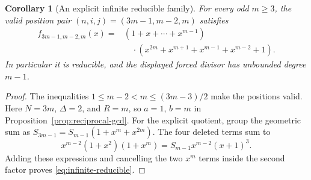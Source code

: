 \documentclass[11pt]{article}
\newtheorem{corollary}[proposition]{Corollary}
\theoremstyle{definition}
\theoremstyle{remark}
\begin{document}
\begin{corollary}[An explicit infinite reducible family]
\label{cor:infinite-reducible}
For every odd \(m\ge3\), the valid position pair
\((n,i,j)=(3m-1,m-2,m)\) satisfies
\begin{equation}\label{eq:infinite-reducible}
\begin{split}
 f_{3m-1,m-2,m}(x)
 ={}&(1+x+\cdots+x^{m-1})\\
 &\quad\cdot(x^{2m}+x^{m+1}+x^{m-1}+x^{m-2}+1).
\end{split}
\end{equation}
In particular it is reducible, and the displayed forced divisor
has unbounded degree \(m-1\).
\end{corollary}
\begin{proof}
The inequalities \(1\le m-2<m\le(3m-3)/2\) make the positions valid.
Here \(N=3m\), \(\Delta=2\), and \(R=m\), so
\(a=1\), \(b=m\) in Proposition~\ref{prop:reciprocal-gcd}.
For the explicit quotient, group the geometric sum as
\(S_{3m-1}=S_{m-1}(1+x^m+x^{2m})\). The four deleted terms sum to
\[
 x^{m-2}(1+x^2)(1+x^m)=S_{m-1}x^{m-2}(x+1)^3.
\]
Adding these expressions and cancelling the two \(x^m\) terms
inside the second factor proves \eqref{eq:infinite-reducible}.
\end{proof}
\end{document}
